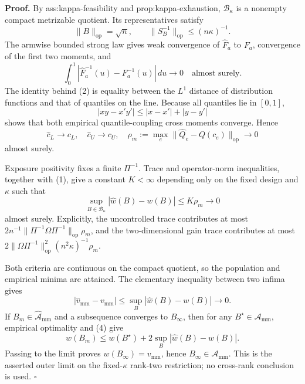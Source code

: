 \textbf{Proof.}
By ass:kappa-feasibility and prop:kappa-exhaustion, \(\mathcal B_\kappa\) is a nonempty compact metrizable quotient.  Its representatives satisfy
\[
\lVert B\rVert_{\mathrm{op}}=\sqrt n,
\qquad \lVert S_B^{-1}\rVert_{\mathrm{op}}\le(n\kappa)^{-1}.
\tag{1}
\]
The armwise bounded strong law gives weak convergence of \(\widehat F_a\) to \(F_a\), convergence of the first two moments, and
\[
\int_0^1|\widehat F_a^{-1}(u)-F_a^{-1}(u)|\,du\longrightarrow0
\quad\text{almost surely}.
\tag{2}
\]
The identity behind (2) is equality between the \(L^1\) distance of distribution functions and that of quantiles on the line.  Because all quantiles lie in \([0,1]\),
\[
|xy-x'y'|\le|x-x'|+|y-y'|
\]
shows that both empirical quantile-coupling cross moments converge.  Hence
\[
\widehat c_L\to c_L,\quad \widehat c_U\to c_U,\quad
\rho_m:=\max_e\lVert\widehat Q_e-Q(c_e)\rVert_{\mathrm{op}}\to0
\tag{3}
\]
almost surely.

Exposure positivity fixes a finite \(\Pi^{-1}\).  Trace and operator-norm inequalities, together with (1), give a constant \(K<\infty\) depending only on the fixed design and \(\kappa\) such that
\[
\sup_{B\in\mathcal B_\kappa}|\widehat w(B)-w(B)|\le K\rho_m\to0
\tag{4}
\]
almost surely.  Explicitly, the uncontrolled trace contributes at most \(2n^{-1}\lVert\Pi^{-1}\Omega\Pi^{-1}\rVert_{\mathrm{op}}\rho_m\), and the two-dimensional gain trace contributes at most \(2\lVert\Omega\Pi^{-1}\rVert_{\mathrm{op}}^2(n^2\kappa)^{-1}\rho_m\).

Both criteria are continuous on the compact quotient, so the population and empirical minima are attained.  The elementary inequality between two infima gives
\[
|\widehat v_{\mathrm{mm}}-v_{\mathrm{mm}}|
\le\sup_B|\widehat w(B)-w(B)|\to0.
\tag{5}
\]
If \(B_m\in\widehat{\mathcal A}_{\mathrm{mm}}\) and a subsequence converges to \(B_\infty\), then for any \(B^\star\in\mathcal A_{\mathrm{mm}}\), empirical optimality and (4) give
\[
w(B_m)\le w(B^\star)+2\sup_B|\widehat w(B)-w(B)|.
\]
Passing to the limit proves \(w(B_\infty)=v_{\mathrm{mm}}\), hence \(B_\infty\in\mathcal A_{\mathrm{mm}}\).  This is the asserted outer limit on the fixed-\(\kappa\) rank-two restriction; no cross-rank conclusion is used. \(\square\)